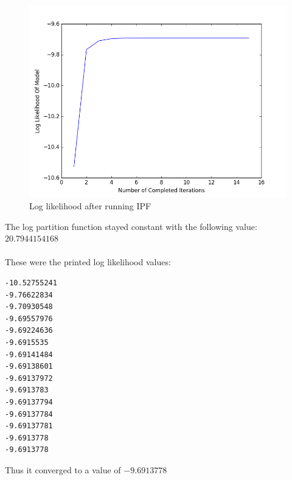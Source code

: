 \documentclass[twoside,11pt]{article}
\theoremstyle{definition}
\begin{document}
\begin{figure}[h]
\centering
\includegraphics[width=6in]{prob2cPlot2.png}
\caption{Log likelihood after running IPF}
\end{figure}

The log partition function stayed constant with the following value:\\
$20.7944154168$\\
\\
These were the printed log likelihood values: \\
\begin{lstlisting}
-10.52755241
-9.76622834
-9.70930548
-9.69557976
-9.69224636
-9.6915535
-9.69141484
-9.69138601
-9.69137972
-9.6913783
-9.69137794
-9.69137784
-9.69137781
-9.6913778
-9.6913778
\end{lstlisting}
Thus it converged to a value of $-9.6913778$
\end{document}
